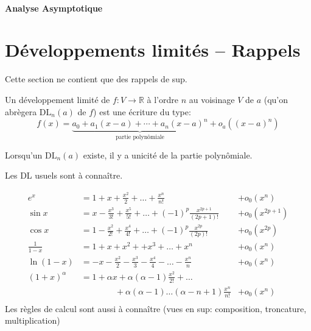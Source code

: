 \ifsolo
    ~

    \vspace{1cm}

    \begin{center}
        \textbf{\LARGE Analyse Asymptotique} \\[1em]
    \end{center}
    \tableofcontents
\else
    \minitoc
\fi
\thispagestyle{empty}

\ifsolo \newpage \setcounter{page}{1} \fi
\section{Développements limités -- Rappels}

Cette section ne contient que des rappels de sup.

\begin{dfn}
    Un développement limité de $f:V\longrightarrow \mathbb R$ à l'ordre $n$ au voisinage $V$ de $a$ (qu'on abrègera $\mathrm{DL}_n(a)$ de $f$) est une écriture du type: \[
        f(x)=\underbrace{a_0+a_1(x-a)+\cdots +a_n(x-a)^n}_{\text{partie polynômiale}}+o_a((x-a)^n)
    \]
\end{dfn}

\begin{rem}
    Lorsqu'un $\mathrm{DL}_n(a)$ existe, il y a unicité de la partie polynômiale.
\end{rem}

\begin{rem}
    Les DL usuels sont à connaître.

\begin{align*}
    e^x &= 1 + x + \frac{x^2}{2} +\ldots+ \frac{x^n}{n!} &+ o_0(x^n) \\
    \sin x &= x - \frac{x^3}{3!}+\frac{x^5}{5!} +\ldots+(-1)^p\frac{x^{2p+1}}{(2p+1)!}
           & +o_0(x^{2p+1} ) \\
    \cos x &= 1 - \frac{x^2}{2!}+\frac{x^4}{4!} +\ldots+(-1)^p\frac{x^{2p}}{(2p)!}
           & +o_0(x^{2p}) \\
    \frac{1}{1-x} &= 1 + x + x^2 + + x^3 + \ldots + x^n
        & + o_0(x^n) \\
    \ln (1-x) &= -x - \frac{x^2}{2} - \frac{x^3}{3} - \frac{x^4}{4} - \ldots - \frac{x^n}{n}
        & + o_0(x^n) \\
    (1+x)^\alpha &= 1 + \alpha x + \alpha (\alpha-1) \frac{x^2}{2!} + \ldots \\
        & \qquad\qquad +\alpha(\alpha-1)\ldots(\alpha-n+1)\frac{x^n}{n!}
        & + o_0(x^n) \\
\end{align*}
Les règles de calcul sont aussi à connaître (vues en sup: composition, troncature, multiplication)
\end{rem}

